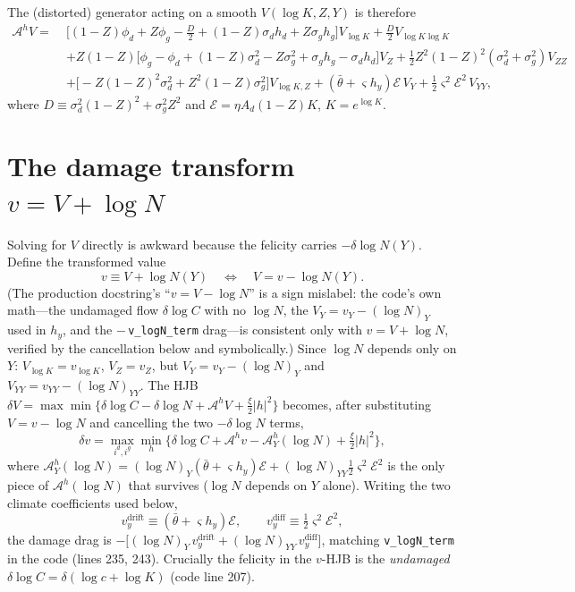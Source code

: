 \documentclass[11pt]{article}
\newcommand{\E}{\mathcal E}
\newcommand{\A}{\mathcal A}
\begin{document}
The (distorted) generator acting on a smooth $V(\log K,Z,Y)$ is therefore
\begin{align*}
\A^h V=\;
&\big[(1-Z)\phi_d+Z\phi_g-\tfrac{D}{2}+(1-Z)\sigma_d h_d+Z\sigma_g h_g\big]V_{\log K}
+\tfrac{D}{2}V_{\log K\log K}\\
&+Z(1-Z)\big[\phi_g-\phi_d+(1-Z)\sigma_d^2-Z\sigma_g^2+\sigma_g h_g-\sigma_d h_d\big]V_Z
+\tfrac12 Z^2(1-Z)^2(\sigma_d^2+\sigma_g^2)V_{ZZ}\\
&+\big[-Z(1-Z)^2\sigma_d^2+Z^2(1-Z)\sigma_g^2\big]V_{\log K,Z}
+(\bar\theta+\varsigma h_y)\E\,V_Y+\tfrac12\varsigma^2\E^2\,V_{YY},
\end{align*}
where $D\equiv\sigma_d^2(1-Z)^2+\sigma_g^2Z^2$ and $\E=\eta A_d(1-Z)K$, $K=e^{\log K}$.

\section{The damage transform $v=V+\log N$}

Solving for $V$ directly is awkward because the felicity carries $-\delta\log N(Y)$. Define the
transformed value
\[
\boxed{\,v\equiv V+\log N(Y)\quad\Longleftrightarrow\quad V=v-\log N(Y).\,}
\]
(The production docstring's ``$v=V-\log N$'' is a sign mislabel: the code's own math---the
undamaged flow $\delta\log C$ with no $\log N$, the $V_Y=v_Y-(\log N)_Y$ used in $h_y$, and the
$-\,$\texttt{v\_logN\_term} drag---is consistent only with $v=V+\log N$, verified by the
cancellation below and symbolically.) Since $\log N$ depends only on $Y$:
$V_{\log K}=v_{\log K}$, $V_Z=v_Z$, but
$V_Y=v_Y-(\log N)_Y$ and $V_{YY}=v_{YY}-(\log N)_{YY}$. The HJB
$\delta V=\max\min\{\delta\log C-\delta\log N+\A^h V+\tfrac{\xi}{2}|h|^2\}$ becomes, after
substituting $V=v-\log N$ and cancelling the two $-\delta\log N$ terms,
\[
\boxed{\;
\delta v=\max_{i^d,i^g}\min_h\Big\{\delta\log C+\A^h v-\A^h_Y(\log N)+\tfrac{\xi}{2}|h|^2\Big\},
\;}
\]
where $\A^h_Y(\log N)=(\log N)_Y(\bar\theta+\varsigma h_y)\E+(\log N)_{YY}\tfrac12\varsigma^2\E^2$
is the only piece of $\A^h(\log N)$ that survives ($\log N$ depends on $Y$ alone). Writing the
two climate coefficients used below,
\[
v_y^{\text{drift}}\equiv(\bar\theta+\varsigma h_y)\E,
\qquad
v_y^{\text{diff}}\equiv\tfrac12\varsigma^2\E^2,
\]
the damage drag is $-\big[(\log N)_Y\,v_y^{\text{drift}}+(\log N)_{YY}\,v_y^{\text{diff}}\big]$,
matching \texttt{v\_logN\_term} in the code (lines 235, 243). Crucially the felicity in the
$v$-HJB is the \emph{undamaged} $\delta\log C=\delta(\log c+\log K)$ (code line 207).
\end{document}
